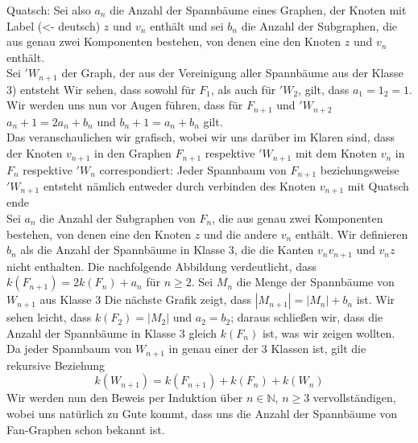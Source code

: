 Quatsch:
Sei also $a_n$ die Anzahl der Spannbäume eines Graphen, der Knoten mit Label (<- deutsch) $z$ und $v_n$ enthält und sei $b_n$ die Anzahl der Subgraphen, die aus genau zwei Komponenten bestehen, von denen eine den Knoten $z$ und $v_n$ enthält.\\
Sei $\prime{W}_{n+1}$ der Graph, der aus der Vereinigung aller Spannbäume aus der Klasse 3) entsteht
Wir sehen, dass sowohl für $F_1$, als auch für $\prime{W}_2$, gilt, dass $a_1=1_2=1$.\\
Wir werden uns nun vor Augen führen, dass für $F_{n+1}$ und $\prime{W}_{n+2}$ $a_n+1 = 2a_n + b_n$ und $b_n+1 = a_n + b_n$ gilt.\\
Das veranschaulichen wir grafisch, wobei wir uns darüber im Klaren sind, dass der Knoten $v_{n+1}$ in den Graphen $F_{n+1}$ respektive $\prime{W}_{n+1}$ mit dem Knoten $v_n$ in $F_{n}$ respektive $\prime{W}_{n}$ correspondiert:
Jeder Spannbaum von $F_{n+1}$ beziehungsweise $\prime{W}_{n+1}$ entsteht nämlich entweder durch verbinden des Knoten $v_{n+1}$ mit
Quatsch ende
\\
Sei $a_n$ die Anzahl der Subgraphen von $F_n$, die aus genau zwei Komponenten bestehen, von denen eine den Knoten $z$ und die andere $v_n$ enthält.
Wir definieren $b_n$ als die Anzahl der Spannbäume in Klasse 3, die die Kanten $v_nv_{n+1}$ und $v_nz$ nicht enthalten. 
Die nachfolgende Abbildung verdeutlicht, dass $\mathit{k}(F_{n+1})=2\mathit{k}(F_{n})+a_n$ für $n\geq 2$.
Sei $M_n$ die Menge der Spannbäume von $W_{n+1}$ aus Klasse 3
Die nächste Grafik zeigt, dass $|M_{n+1}|=|M_n|+b_n$ ist.
Wir sehen leicht, dass $\mathit{k}(F_2) = |M_2|$ und $a_2=b_2$; daraus schließen wir, dass die Anzahl der Spannbäume in Klasse 3 gleich $\mathit{k}(F_{n})$ ist, was wir zeigen wollten.
Da jeder Spannbaum von $W_{n+1}$ in genau einer der 3 Klassen ist, gilt die rekursive Beziehung
\begin{equation}
\mathit{k}(W_{n+1}) = \mathit{k}(F_{n+1}) + \mathit{k}(F_n) + \mathit{k}(W_n)
\label{eq:wrek}
\end{equation}
Wir werden nun den Beweis per Induktion über $n \in \mathbb{N}, \, n \geq 3$ vervollständigen, wobei uns natürlich zu Gute kommt, dass uns die Anzahl der Spannbäume von Fan-Graphen schon bekannt ist.\\
